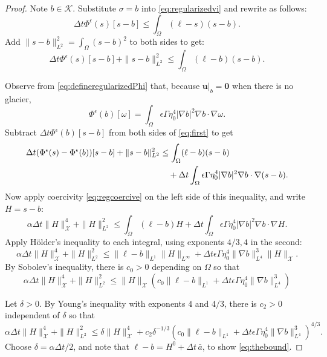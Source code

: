 \documentclass[12pt]{article}
\newcommand{\bu}{\ensuremath{\mathbf{u}}}
\newcommand{\bzero}{\ensuremath{\bm{0}}}
\newcommand{\cK}{\ensuremath{\mathcal{K}}}
\newcommand{\cX}{\ensuremath{\mathcal{X}}}
\newcommand{\grad}{\ensuremath{\nabla}}
\newcommand{\eps}{\ensuremath{\epsilon}}
\begin{document}
\begin{proof}
Note $b\in\cK$.  Substitute $\sigma=b$ into \eqref{eq:regularizedvi} and rewrite as follows:
\begin{equation}
\Delta t \Phi^\eps(s)[s-b] \le \int_\Omega (\ell - s) (s - b).
\end{equation}
Add $\|s-b\|_{L^2}^2=\int_\Omega (s - b)^2$ to both sides to get:
\begin{equation}
\Delta t \Phi^\eps(s)[s-b] + \|s-b\|_{L^2}^2 \le \int_\Omega (\ell - b) (s - b). \label{eq:first}
\end{equation}

Observe from \eqref{eq:defineregularizedPhi} that, because $\bu|_b=\bzero$ when there is no glacier,
\begin{equation}
\Phi^\eps(b)[\omega] = \int_\Omega \eps \Gamma \eta_0^4 |\grad b|^2 \grad b \cdot \grad\omega.
\end{equation}
Subtract $\Delta t\Phi^\eps(b)[s-b]$ from both sides of \eqref{eq:first} to get
\begin{align}
\Delta t (\Phi^\eps(s) - \Phi^\eps(b))[s-b] + \|s-b\|_{L^2}^2 &\le \int_\Omega (\ell - b) (s - b) \\
 &\quad + \Delta t \int_\Omega \eps \Gamma \eta_0^4 |\grad b|^2 \grad b \cdot \grad(s-b). \notag
\end{align}
Now apply coercivity \eqref{eq:regcoercive} on the left side of this inequality, and write $H=s-b$:
\begin{equation}
\alpha \Delta t \|H\|_{\cX}^4 + \|H\|_{L^2}^2 \le \int_\Omega (\ell - b) H + \Delta t \int_\Omega \eps \Gamma \eta_0^4 |\grad b|^2 \grad b \cdot \grad H.
\end{equation}
Apply H\"older's inequality to each integral, using exponents $4/3,4$ in the second:
\begin{equation}
\alpha \Delta t \|H\|_{\cX}^4 + \|H\|_{L^2}^2 \le \|\ell - b\|_{L^1} \|H\|_{L^\infty} + \Delta t \eps \Gamma \eta_0^4 \|\grad b\|_{L^4}^3 \|H\|_{\cX}.
\end{equation}
By Sobolev's inequality, there is $c_0>0$ depending on $\Omega$ so that
\begin{equation}
\alpha \Delta t \|H\|_{\cX}^4 + \|H\|_{L^2}^2 \le \|H\|_{\cX} \left(c_0\|\ell - b\|_{L^1}  + \Delta t \eps \Gamma \eta_0^4 \|\grad b\|_{L^4}^3\right)
\end{equation}

Let $\delta>0$.  By Young's inequality \cite{Evans2010} with exponents $4$ and $4/3$, there is $c_2>0$ independent of $\delta$ so that
\begin{equation}
\alpha \Delta t \|H\|_{\cX}^4 + \|H\|_{L^2}^2 \le \delta \|H\|_{\cX}^4 + c_2 \delta^{-1/3} \left(c_0\|\ell - b\|_{L^1}  + \Delta t \eps \Gamma \eta_0^4 \|\grad b\|_{L^4}^3\right)^{4/3}.
\end{equation}
Choose $\delta = \alpha \Delta t/2$, and note that $\ell-b=H^0 + \Delta t\,\bar a$, to show \eqref{eq:thebound}.
\end{proof}
\end{document}
